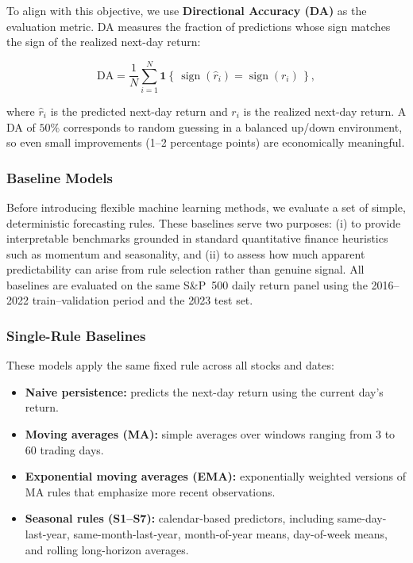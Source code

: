 \documentclass[11pt]{article}
\begin{document}
\vspace{6pt}
\noindent To align with this objective, we use \textbf{Directional Accuracy (DA)} as the evaluation metric. DA measures the fraction of predictions whose sign matches the sign of the realized next-day return:

\[
\text{DA} = \frac{1}{N} \sum_{i=1}^{N} \mathbf{1}\left\{\, \operatorname{sign}(\hat{r}_i) = \operatorname{sign}(r_i) \,\right\},
\]


\noindent where $\hat{r}_i$ is the predicted next-day return and $r_i$ is the realized next-day return. A DA of $50\%$ corresponds to random guessing in a balanced up/down environment, so even small improvements (1--2 percentage points) are economically meaningful.

\subsubsection{Baseline Models}


Before introducing flexible machine learning methods, we evaluate a set of simple, deterministic forecasting rules. 
These baselines serve two purposes: (i) to provide interpretable benchmarks grounded in standard quantitative finance heuristics such as momentum and seasonality, and (ii) to assess how much apparent predictability can arise from rule selection rather than genuine signal. 
All baselines are evaluated on the same S\&P~500 daily return panel using the 2016--2022 train--validation period and the 2023 test set.

\subsubsection*{Single-Rule Baselines}

These models apply the same fixed rule across all stocks and dates:

\begin{itemize}
    \item \textbf{Naive persistence:} predicts the next-day return using the current day's return.
    \item \textbf{Moving averages (MA):} simple averages over windows ranging from 3 to 60 trading days.
    \item \textbf{Exponential moving averages (EMA):} exponentially weighted versions of MA rules that emphasize more recent observations.
    \item \textbf{Seasonal rules (S1--S7):} calendar-based predictors, including same-day-last-year, same-month-last-year, 
    month-of-year means, day-of-week means, and rolling long-horizon averages.
\end{itemize}
\end{document}
